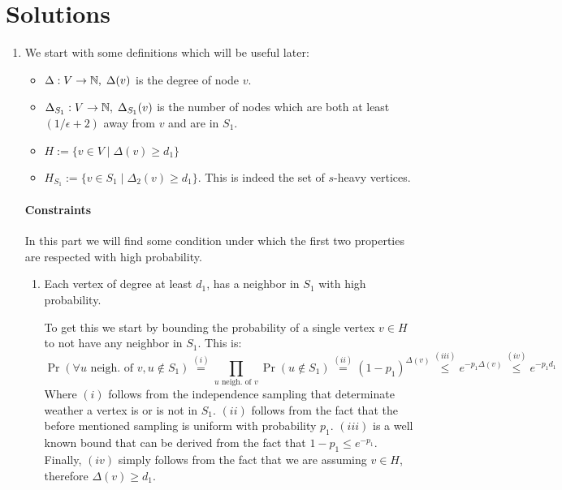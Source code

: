 \documentclass[11pt]{article}
\begin{document}
\section*{Solutions}
\begin{enumerate}
    \item We start with some definitions which will be useful later:
    \begin{itemize}
        \item $\Delta: V \to \mathbb{N},\;\Delta (v) $ is the degree of node $v$.
        \item $\Delta_{S_1}: V \to \mathbb{N},\;\Delta_{S_1} (v) $ is the number of nodes which are both at least $\left(1/\epsilon + 2\right)$ away from $v$ and are in $S_1$.
        \item $H := \{v\in V \mid \Delta (v) \geq d_1\}$
        \item $H_{S_1} := \{v\in S_1 \mid \Delta_2 (v) \geq d_1\}$. This is indeed the set of $s$-heavy vertices.
    \end{itemize}
    \paragraph*{Constraints} In this part we will find some condition under which the first two properties are respected with high probability. 
    \begin{enumerate}
        \item Each vertex of degree at least $d_1$, has a neighbor in $S_1$ with high probability. 
        
        To get this we start by bounding the probability of a single vertex $v \in H$ to not have any neighbor in $S_1$. This is:
        \begin{equation*}
            \Pr\left(\forall u \text{ neigh. of }v, u \notin S_1\right) \stackrel{(i)}{=} \prod_{u \text{ neigh. of }v} \Pr\left(u \notin S_1\right) \stackrel{(ii)}{=} (1-p_1)^{\Delta(v)} \stackrel{(iii)}{\leq} e^{-p_1\Delta(v)} \stackrel{(iv)}{\leq} e^{-p_1d_1}
        \end{equation*}
        Where $(i)$ follows from the independence sampling that determinate weather a vertex is or is not in $S_1$. $(ii)$ follows from the fact that the before mentioned sampling is uniform with probability $p_1$. $(iii)$ is a well known bound that can be derived from the fact that $1-p_1 \leq e^{-p_1}$. Finally, $(iv)$ simply follows from the fact that we are assuming $v \in H$, therefore $\Delta(v)\geq d_1$.


\end{enumerate}
\end{enumerate}
\end{document}
